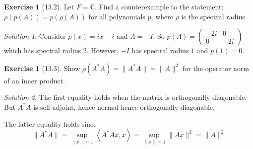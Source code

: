 \documentclass[reqno]{amsart}
\theoremstyle{definition}
\newtheorem{exercise}[theorem]{Exercise}
\theoremstyle{remark}
\newtheorem*{solution}{Solution}
\begin{document}
    \begin{exercise}[13.2]
        Let $F = \mathbb{C}$. Find a counterexample to the
        statement:
        $\rho \left( p \left( A \right)  \right) 
        = p \left( \rho(A) \right) $ for all polynomials
        $p$, where $\rho$ is the spectral radius. 
    \end{exercise}

    \begin{solution}

        Consider $p(x) = ix - i$ and
        $A = -I$. So
        $p(A) = \begin{pmatrix} -2i &0 \\0 & -2i \end{pmatrix} $ 
        which has spectral radius
        $2$. However,
        $-I$ has spectral radius $1$ and
        $p(1) = 0$.
    \end{solution}

    \begin{exercise}[13.3]
        Show $\rho \left( A^{*}A \right) 
        = \|A^{*}A\| = \|A\|^2$ for the
        operator
        norm of an inner product.
    \end{exercise}


    \begin{solution}
        The first equality holds when
        the matrix is orthogonally diagonable.
        But  $A^{*}A$ is self-adjoint, hence
        normal hence orthogonally diagonable.

        The latter equality holds since
        \[
        \|A^{*}A\| =
        \sup_{\|x\|=1} \left<A^{*}Ax, x \right>
        = \sup_{\|x\|=1} \|Ax\|^2
        = \|A\|^2
        \] 
    \end{solution}



























\end{document}
